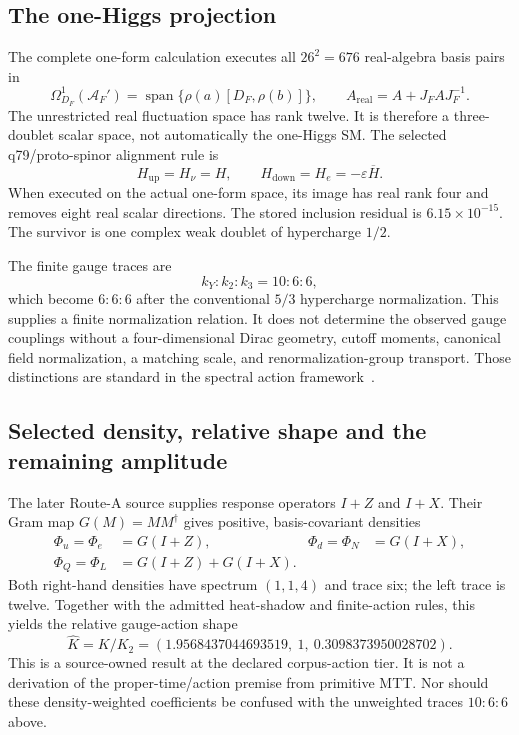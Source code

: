 \documentclass[11pt]{article}
\newcommand{\cA}{\mathcal{A}}
\begin{document}
\subsection{The one-Higgs projection}

The complete one-form calculation executes all $26^2=676$ real-algebra basis pairs in
\begin{equation}
\Omega^1_{D_F}(\cA_F')=\operatorname{span}\{\rho(a)[D_F,\rho(b)]\},
\qquad A_{\mathrm{real}}=A+J_FAJ_F^{-1}.
\end{equation}
The unrestricted real fluctuation space has rank twelve.  It is therefore a three-doublet
scalar space, not automatically the one-Higgs SM.  The selected q79/proto-spinor alignment rule
is
\begin{equation}
H_{\mathrm{up}}=H_{\nu}=H,\qquad
H_{\mathrm{down}}=H_e=-\varepsilon\overline H.
\end{equation}
When executed on the actual one-form space, its image has real rank four and removes eight real
scalar directions.  The stored inclusion residual is $6.15\times10^{-15}$.  The survivor is one
complex weak doublet of hypercharge $1/2$.

The finite gauge traces are
\begin{equation}
k_Y:k_2:k_3=10:6:6,
\end{equation}
which become $6:6:6$ after the conventional $5/3$ hypercharge normalization.  This supplies a
finite normalization relation.  It does not determine the observed gauge couplings without a
four-dimensional Dirac geometry, cutoff moments, canonical field normalization, a matching
scale, and renormalization-group transport.  Those distinctions are standard in the spectral
action framework~\cite{ChamseddineConnes1996}.

\subsection{Selected density, relative shape and the remaining amplitude}

The later Route-A source supplies response operators $I+Z$ and $I+X$.  Their Gram map
$G(M)=MM^\dagger$ gives positive, basis-covariant densities
\begin{equation}
\begin{aligned}
\Phi_u=\Phi_e&=G(I+Z),&\Phi_d=\Phi_N&=G(I+X),\\
\Phi_Q=\Phi_L&=G(I+Z)+G(I+X).
\end{aligned}
\end{equation}
Both right-hand densities have spectrum $(1,1,4)$ and trace six; the left trace is twelve.
Together with the admitted heat-shadow and finite-action rules, this yields the relative
gauge-action shape
\begin{equation}
\widehat K=K/K_2=(1.9568437044693519,\ 1,\ 0.3098373950028702).
\end{equation}
This is a source-owned result at the declared corpus-action tier.  It is not a derivation
of the proper-time/action premise from primitive MTT.  Nor should these density-weighted
coefficients be confused with the unweighted traces $10:6:6$ above.
\end{document}
